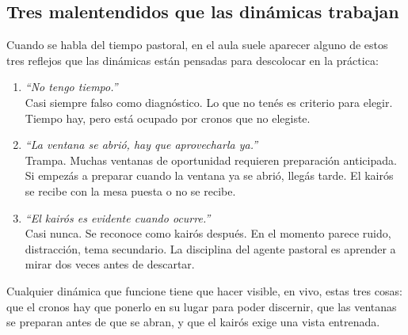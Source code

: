 \documentclass[11pt, a4paper]{article}
\begin{document}
\subsection*{Tres malentendidos que las dinámicas trabajan}

Cuando se habla del tiempo pastoral, en el aula suele aparecer alguno de estos tres reflejos que las dinámicas están pensadas para descolocar en la práctica:

\begin{enumerate}[label={\color{tiempoAmbar}\arabic*.}]
  \item \emph{``No tengo tiempo.''} \\
        Casi siempre falso como diagnóstico. Lo que no tenés es criterio para elegir. Tiempo hay, pero está ocupado por cronos que no elegiste.
  \item \emph{``La ventana se abrió, hay que aprovecharla ya.''} \\
        Trampa. Muchas ventanas de oportunidad requieren preparación anticipada. Si empezás a preparar cuando la ventana ya se abrió, llegás tarde. El kairós se recibe con la mesa puesta o no se recibe.
  \item \emph{``El kairós es evidente cuando ocurre.''} \\
        Casi nunca. Se reconoce como kairós después. En el momento parece ruido, distracción, tema secundario. La disciplina del agente pastoral es aprender a mirar dos veces antes de descartar.
\end{enumerate}

Cualquier dinámica que funcione tiene que hacer visible, en vivo, estas tres cosas: que el cronos hay que ponerlo en su lugar para poder discernir, que las ventanas se preparan antes de que se abran, y que el kairós exige una vista entrenada.

\vspace{1.5em}
\end{document}
